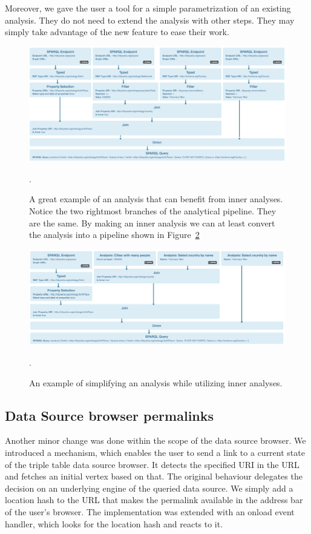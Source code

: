Moreover, we gave the user a tool for a simple parametrization of an existing analysis. 
They do not need to extend the analysis with other steps. They may simply take 
advantage of the new feature to ease their work.

\begin{figure}
	\centering
	\includegraphics[width=140mm]{img/inner-example.png}
	\caption{A great example of an analysis that can benefit from inner analyses. Notice the
	two rightmost branches of the analytical pipeline. They are the same. By making
	an inner analysis we can at least convert the analysis into a pipeline shown in 
	Figure~\ref{fig:inner-example-simpler}}.
	\label{fig:inner-example}
\end{figure}

\begin{figure}
	\centering
	\includegraphics[width=140mm]{img/inner-example-simpler.png}
	\caption{An example of simplifying an analysis while utilizing inner analyses.}.
	\label{fig:inner-example-simpler}
\end{figure}

\subsection{Data Source browser permalinks}
Another minor change was done within the scope of the data source browser.
We introduced a mechanism, which enables the user to send a link to a current 
state of the triple table data source browser. It detects the specified URI in 
the URL and fetches an initial vertex based on that. The original behaviour delegates 
the decision on an underlying engine of the queried data source. We simply add a 
location hash to the URL that makes the permalink available in the address bar 
of the user's browser. The implementation was extended with an onload event 
handler, which looks for the location hash and reacts to it.

